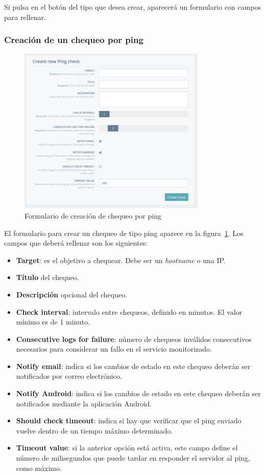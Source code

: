 Si pulsa en el botón del tipo que desea crear, aparecerá un formulario con
campos para rellenar.

\subsubsection{Creación de un chequeo por ping}

\begin{figure}[hbtp]
  \centering
  \includegraphics[width=0.8\textwidth]{apendice_manual_usuario/pantalla_crear_ping.png}
  \caption{Formulario de creación de chequeo por ping}
  \label{fig:crear-ping}
\end{figure}

El formulario para crear un chequeo de tipo ping aparece en la
figura~\ref{fig:crear-ping}. Los campos que deberá rellenar son los siguientes:

\begin{itemize}
\item \textbf{Target}: es el objetivo a chequear. Debe ser un \textit{hostname} o una IP.
\item \textbf{Título} del chequeo.
\item \textbf{Descripción} opcional del chequeo.
\item \textbf{Check interval}: intervalo entre chequeos, definido en minutos. El
  valor mínimo es de 1 minuto.
\item \textbf{Consecutive logs for failure}: número de chequeos inválidos
  consecutivos necesarios para considerar un fallo en el servicio monitorizado.
\item \textbf{Notify email}: indica si los cambios de estado en este chequeo
  deberán ser notificados por correo electrónico.
\item \textbf{Notify Android}: indica si los cambios de estado en este chequeo
  deberán ser notificados mediante la aplicación Android.
\item \textbf{Should check timeout}: indica si hay que verificar que el ping
  enviado vuelve dentro de un tiempo máximo determinado.
\item \textbf{Timeout value}: si la anterior opción está activa, este campo
  define el número de milisegundos que puede tardar en responder el servidor al
  ping, como máximo.
\end{itemize}

